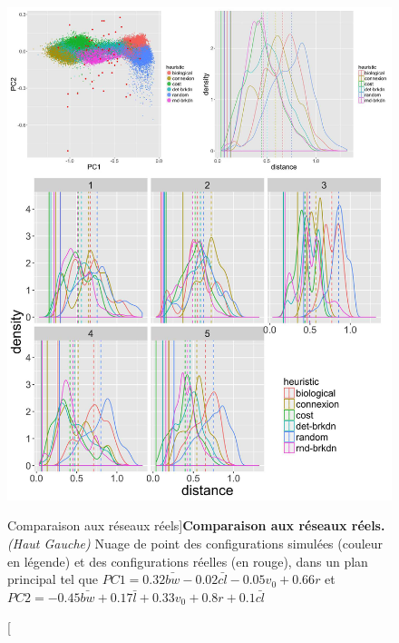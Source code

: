 \begin{figure}
\includegraphics[width=\linewidth,height=0.85\textheight]{Figures/Final/7-1-2-fig-networkgrowth-realdistance}
\caption[][Comparaison aux réseaux réels]{}{\textbf{Comparaison aux réseaux réels.} \textit{(Haut Gauche)} Nuage de point des configurations simulées (couleur en légende) et des configurations réelles (en rouge), dans un plan principal tel que $PC1 = 0.32 \bar{bw} - 0.02 \bar{cl} - 0.05 v_0 + 0.66 r$ et $PC2 = -0.45 \bar{bw} + 0.17 \bar{l} +0.33 v_0 + 0.8 r +0.1 \bar{cl}$\label{fig:networkgrowth:realdistance}}
\end{figure}




%


